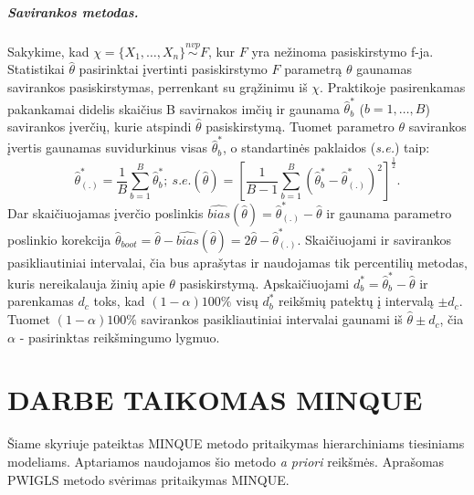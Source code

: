\documentclass[12pt,a4paper]{article}
\begin{document}
\subparagraph{Savirankos metodas.} Sakykime, kad $\chi = \{X_1,\dots,X_n\}\stackrel{nvp}{\sim}F$, kur $F$ yra nežinoma pasiskirstymo f-ja. Statistikai $\hat{\theta}$ pasirinktai įvertinti pasiskirstymo $F$ parametrą $\theta$ gaunamas savirankos pasiskirstymas, perrenkant su grąžinimu iš $\chi$. Praktikoje pasirenkamas pakankamai didelis skaičius B savirnakos imčių ir gaunama $\hat{\theta}^*_b$ ($b=1,\dots,B$) savirankos įverčių, kurie atspindi $\hat{\theta}$ pasiskirstymą. Tuomet parametro $\theta$ savirankos įvertis gaunamas suvidurkinus visas $\hat{\theta}^*_b$, o standartinės paklaidos (\textit{s.e.}) taip:
\[
\hat{\theta}^*_{(.)}=\frac{1}{B}\sum^B_{b=1}\hat{\theta}^*_b; \
s.e.(\hat{\theta})=\left[\frac{1}{B-1}\sum^B_{b=1}(\hat{\theta}^*_b - \hat{\theta}^*_{(.)})^2\right]^{\frac{1}{2}}.
\]
Dar skaičiuojamas įverčio poslinkis $\widehat{bias}(\hat{\theta})=\hat{\theta}^*_{(.)}-\hat{\theta}$ ir gaunama parametro poslinkio korekcija $\hat{\theta}_{boot}=\hat{\theta}-\widehat{bias}(\hat{\theta})=2\hat{\theta}-\hat{\theta}^*_{(.)}$. Skaičiuojami ir savirankos pasikliautiniai intervalai, čia bus aprašytas ir naudojamas tik percentilių metodas, kuris nereikalauja žinių apie $\theta$ pasiskirstymą. Apskaičiuojami $d^*_b=\hat{\theta}^*_b-\hat{\theta}$ ir parenkamas $d_c$ toks, kad $(1-\alpha)100\%$ visų $d^*_b$ reikšmių patektų į intervalą $\pm d_c$. Tuomet $(1-\alpha)100\%$ savirankos pasikliautiniai intervalai gaunami iš $\hat{\theta}\pm d_c$, čia $\alpha$ - pasirinktas reikšmingumo lygmuo.

\newpage
\section{DARBE TAIKOMAS MINQUE} \label{sec:hlmminque}
\indent Šiame skyriuje pateiktas MINQUE metodo pritaikymas hierarchiniams tiesiniams modeliams. Aptariamos naudojamos šio metodo \textit{a priori} reikšmės. Aprašomas PWIGLS metodo svėrimas pritaikymas MINQUE.
\end{document}
